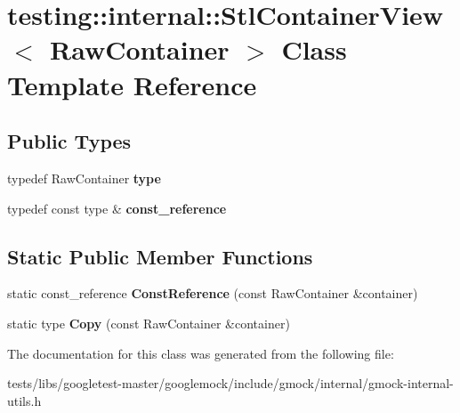 \hypertarget{classtesting_1_1internal_1_1StlContainerView}{}\section{testing\+:\+:internal\+:\+:Stl\+Container\+View$<$ Raw\+Container $>$ Class Template Reference}
\label{classtesting_1_1internal_1_1StlContainerView}
\subsection*{Public Types}
\begin{DoxyCompactItemize}
\item 
\mbox{\label{classtesting_1_1internal_1_1StlContainerView_a2b2c63a6dcdbfe63fb0ee121ebf463ba}} 
typedef Raw\+Container {\bfseries type}
\item 
\mbox{\label{classtesting_1_1internal_1_1StlContainerView_a9cd4f6ed689b3938cdb7b3c4cbf1b36b}} 
typedef const type \& {\bfseries const\+\_\+reference}
\end{DoxyCompactItemize}
\subsection*{Static Public Member Functions}
\begin{DoxyCompactItemize}
\item 
\mbox{\label{classtesting_1_1internal_1_1StlContainerView_a36eccf53329730f6e55c12002128bf25}} 
static const\+\_\+reference {\bfseries Const\+Reference} (const Raw\+Container \&container)
\item 
\mbox{\label{classtesting_1_1internal_1_1StlContainerView_a441123838221f1284873f66ed968f279}} 
static type {\bfseries Copy} (const Raw\+Container \&container)
\end{DoxyCompactItemize}


The documentation for this class was generated from the following file\+:\begin{DoxyCompactItemize}
\item 
tests/libs/googletest-\/master/googlemock/include/gmock/internal/gmock-\/internal-\/utils.\+h\end{DoxyCompactItemize}
